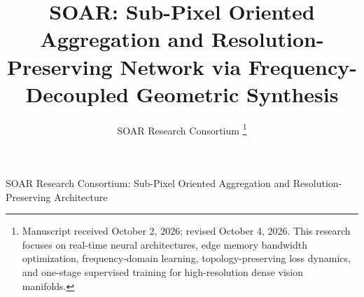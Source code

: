 \documentclass[11pt,a4paper]{article}
\begin{document}
\title{\Large\textbf{SOAR: Sub-Pixel Oriented Aggregation and Resolution-Preserving Network via Frequency-Decoupled Geometric Synthesis}}
\date{}

\author{SOAR Research Consortium%
\thanks{Manuscript received October 2, 2026; revised October 4, 2026. This research focuses on real-time neural architectures, edge memory bandwidth optimization, frequency-domain learning, topology-preserving loss dynamics, and one-stage supervised training for high-resolution dense vision manifolds.}}

%
{SOAR Research Consortium: Sub-Pixel Oriented Aggregation and Resolution-Preserving Architecture}

\maketitle
\end{document}
